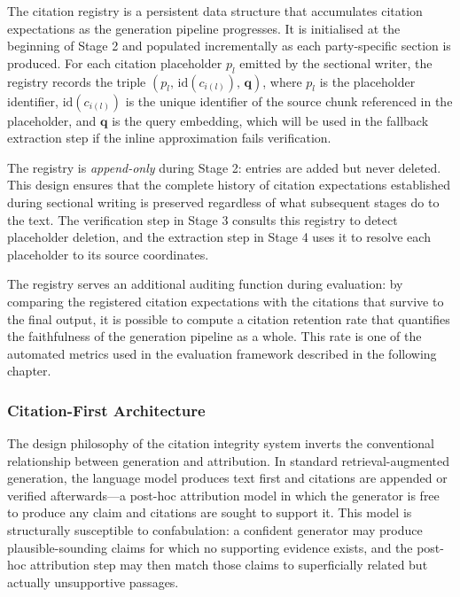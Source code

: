 The citation registry is a persistent data structure that accumulates citation expectations
as the generation pipeline progresses. It is initialised at the beginning of Stage 2 and
populated incrementally as each party-specific section is produced. For each citation
placeholder $p_l$ emitted by the sectional writer, the registry records the triple
$(p_l,\, \text{id}(c_{i(l)}),\, \mathbf{q})$, where $p_l$ is the placeholder identifier,
$\text{id}(c_{i(l)})$ is the unique identifier of the source chunk referenced in the
placeholder, and $\mathbf{q}$ is the query embedding, which will be used in the fallback
extraction step if the inline approximation fails verification.

The registry is \textit{append-only} during Stage 2: entries are added but never deleted.
This design ensures that the complete history of citation expectations established during
sectional writing is preserved regardless of what subsequent stages do to the text. The
verification step in Stage 3 consults this registry to detect placeholder deletion, and the
extraction step in Stage 4 uses it to resolve each placeholder to its source coordinates.

The registry serves an additional auditing function during evaluation: by comparing the
registered citation expectations with the citations that survive to the final output, it
is possible to compute a citation retention rate that quantifies the faithfulness of the
generation pipeline as a whole. This rate is one of the automated metrics used in the
evaluation framework described in the following chapter.

\subsubsection{Citation-First Architecture}

The design philosophy of the citation integrity system inverts the conventional relationship
between generation and attribution. In standard retrieval-augmented generation, the language
model produces text first and citations are appended or verified afterwards---a post-hoc
attribution model in which the generator is free to produce any claim and citations are
sought to support it. This model is structurally susceptible to confabulation: a confident
generator may produce plausible-sounding claims for which no supporting evidence exists, and
the post-hoc attribution step may then match those claims to superficially related but
actually unsupportive passages.

